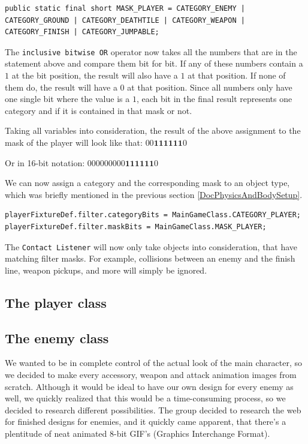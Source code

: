 \documentclass[12p]{article}
\begin{document}
\begin{verbatim}
public static final short MASK_PLAYER = CATEGORY_ENEMY | CATEGORY_GROUND | CATEGORY_DEATHTILE | CATEGORY_WEAPON | CATEGORY_FINISH | CATEGORY_JUMPABLE;
\end{verbatim}

The \texttt{inclusive bitwise OR} operator now takes all the numbers that are in the statement above and compare them bit for bit. If any of these numbers contain a $1$ at the bit position, the result will also have a $1$ at that position. If none of them do, the result will have a $0$ at that position. Since all numbers only have one single bit where the value is a $1$, each bit in the final result represents one category and if it is contained in that mask or not.

Taking all variables into consideration, the result of the above assignment to the mask of the player will look like that: $00\mathbf{111111}0$

Or in 16-bit notation: $000000000\mathbf{111111}0$

We can now assign a category and the corresponding mask to an object type, which was briefly mentioned in the previous section \ref{DocPhysicsAndBodySetup}.

\begin{verbatim}
playerFixtureDef.filter.categoryBits = MainGameClass.CATEGORY_PLAYER;
playerFixtureDef.filter.maskBits = MainGameClass.MASK_PLAYER;
\end{verbatim}

The \texttt{Contact Listener} will now only take objects into consideration, that have matching filter masks. For example, collisions between an enemy and the finish line, weapon pickups, and more will simply be ignored.


\subsection{The player class} \label{DocPlayerClass}


\subsection{The enemy class} \label{DocEnemyClass}

We wanted to be in complete control of the actual look of the main character, so we decided to make every accessory, weapon and attack animation images from scratch. Although it would be ideal to have our own design for every enemy as well, we quickly realized that this would be a time-consuming process, so we decided to research different possibilities. The group decided to research the web for finished designs for enemies, and it quickly came apparent, that there’s a plentitude of neat animated 8-bit GIF’s (Graphics Interchange Format). 
\end{document}
